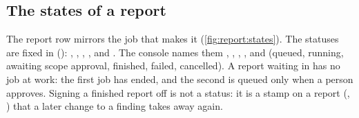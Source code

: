 \subsection{The states of a report}

The report row mirrors the job that makes it (\cref{fig:report:states}). The statuses are
fixed in  (): , ,
, ,  and . The console names them
, , , ,
 and  (queued, running, awaiting scope approval, finished, failed,
cancelled). A report waiting in  has no job at work: the first job has
ended, and the second is queued only when a person approves. Signing a finished report off is
not a status: it is a stamp on a  report (, )
that a later change to a finding takes away again.

